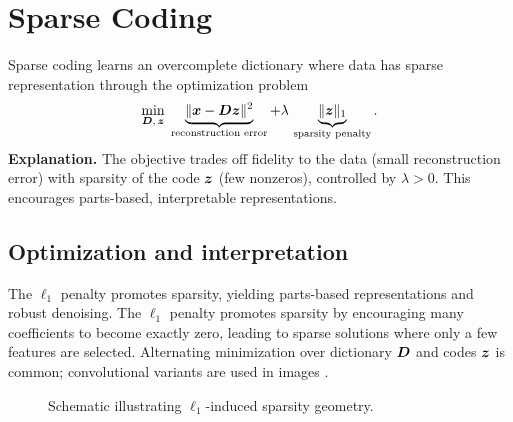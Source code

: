 
\section{Sparse Coding }
\label{sec:sparse-coding}

Sparse coding learns an overcomplete dictionary where data has sparse representation through the optimization problem
\begin{equation}
\min_{\boldsymbol{D},\, \boldsymbol{z}}\; \underbrace{\lVert \boldsymbol{x} - \boldsymbol{D}\boldsymbol{z} \rVert^2}_{\text{reconstruction error}} + \lambda\, \underbrace{\lVert \boldsymbol{z} \rVert_1}_{\text{sparsity penalty}}.
\end{equation}
\noindent\textbf{Explanation.} The objective trades off fidelity to the data (small reconstruction error) with sparsity of the code $\boldsymbol{z}$ (few nonzeros), controlled by $\lambda>0$. This encourages parts-based, interpretable representations.

\subsection{Optimization and interpretation}

The $\ell_1$ penalty promotes sparsity, yielding parts-based representations and robust denoising. The $\ell_1$ penalty promotes sparsity by encouraging many coefficients to become exactly zero, leading to sparse solutions where only a few features are selected. Alternating minimization over dictionary $\boldsymbol{D}$ and codes $\boldsymbol{z}$ is common; convolutional variants are used in images \textcite{GoodfellowEtAl2016}.

\begin{figure}[h]
  \centering
  \caption{Schematic illustrating $\ell_1$-induced sparsity geometry.}
  \label{fig:l1-geometry}
\end{figure}
